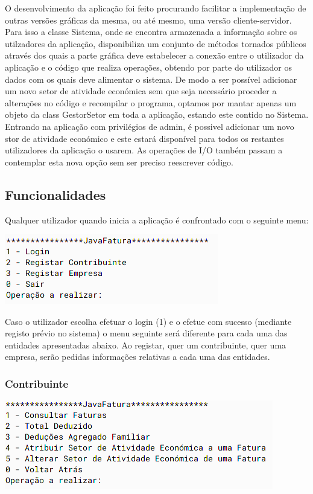 \documentclass[a4paper]{article}
\begin{document}
O desenvolvimento da aplicação foi feito procurando facilitar a implementação de outras versões gráficas da mesma, ou até mesmo, uma versão cliente-servidor. Para isso a classe 
Sistema, onde se encontra armazenada a informação sobre os utilzadores da aplicação, disponibiliza um conjunto de métodos tornados públicos através dos quais a parte gráfica
deve estabelecer a conexão entre o utilizador da aplicação e o código que realiza operações, obtendo por parte do utilizador os dados com os quais deve alimentar o sistema.
De modo a ser possível adicionar um novo setor de atividade económica sem que seja necessário proceder a alterações no código e recompilar o programa, optamos por mantar apenas
um objeto da class GestorSetor em toda a aplicação, estando este contido no Sistema. Entrando na aplicação com privilégios de admin, é possivel adicionar um novo stor de
atividade económico e este estará disponível para todos os restantes utilizadores da aplicação o usarem. As operações de I/O também passam a contemplar esta nova opção sem ser
preciso reescrever código.



\subsection{Funcionalidades}
\label{sec:funcionalidades}

Qualquer utilizador quando inicia a aplicação é confrontado com o seguinte menu:

	\includegraphics[width=.6\linewidth]{main_menu.png}

Caso o utilizador escolha efetuar o login (1) e o efetue com sucesso (mediante registo prévio no sistema)
o menu seguinte será diferente para cada uma das entidades apresentadas abaixo.
Ao registar, quer um contribuinte, quer uma empresa, serão pedidas informações relativas a cada uma das entidades.


\subsubsection{Contribuinte}

	\includegraphics[width=.7\linewidth]{contribuinte_menu.png}
\end{document}

